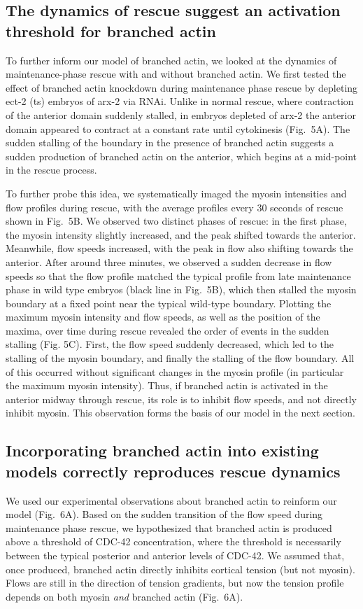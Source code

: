 \documentclass[11pt]{article}
\newcommand{\6}[1]{#1_{\text{6}}}
\newcommand{\3}[1]{#1_{\text{3}}}
\begin{document}
\subsection*{The dynamics of rescue suggest an activation threshold for branched actin}
To further inform our model of branched actin, we looked at the dynamics of maintenance-phase rescue with and without branched actin. We first tested the effect of branched actin knockdown during maintenance phase rescue by depleting ect-2 (ts) embryos of arx-2 via RNAi. Unlike in normal rescue, where contraction of the anterior domain suddenly stalled, in embryos depleted of arx-2 the anterior domain appeared to contract at a constant rate until cytokinesis (Fig.\ 5A). The sudden stalling of the boundary in the presence of branched actin suggests a sudden production of branched actin on the anterior, which begins at a mid-point in the rescue process. 

To further probe this idea, we systematically imaged the myosin intensities and flow profiles during rescue, with the average profiles every 30 seconds of rescue shown in Fig.\ 5B. We observed two distinct phases of rescue: in the first phase, the myosin intensity slightly increased, and the peak shifted towards the anterior. Meanwhile, flow speeds increased, with the peak in flow also shifting towards the anterior. After around three minutes, we observed a sudden decrease in flow speeds so that the flow profile matched the typical profile from late maintenance phase in wild type embryos (black line in Fig.\ 5B), which then stalled the myosin boundary at a fixed point near the typical wild-type boundary. Plotting the maximum myosin intensity and flow speeds, as well as the position of the maxima, over time during rescue revealed the order of events in the sudden stalling (Fig. 5C). First, the flow speed suddenly decreased, which led to the stalling of the myosin boundary, and finally the stalling of the flow boundary. All of this occurred without significant changes in the myosin profile (in particular the maximum myosin intensity). Thus, if branched actin is activated in the anterior midway through rescue, its role is to inhibit flow speeds, and not directly inhibit myosin. This observation forms the basis of our model in the next section.

\subsection*{Incorporating branched actin into existing models correctly reproduces rescue dynamics}
We used our experimental observations about branched actin to reinform our model (Fig.\ 6A). Based on the sudden transition of the flow speed during maintenance phase rescue, we hypothesized that branched actin is produced above a threshold of CDC-42 concentration, where the threshold is necessarily between the typical posterior and anterior levels of CDC-42. We assumed that, once produced, branched actin directly inhibits cortical tension (but not myosin). Flows are still in the direction of tension gradients, but now the tension profile depends on both myosin \emph{and} branched actin (Fig.\ 6A).
\end{document}
